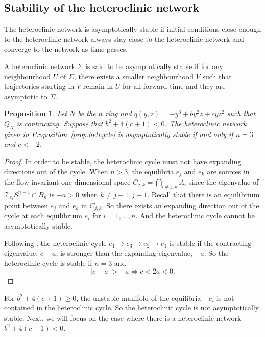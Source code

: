 \documentclass{article}
\newtheorem{prop}{Proposition}
\theoremstyle{definition}
\newenvironment{defi}
  {\pushQED{\qed}\renewcommand{\qedsymbol}{$\lozenge$}\defix}
  {\popQED\enddefix}
\begin{document}
\subsection{Stability of the heteroclinic network}

The heteroclinic network is asymptotically stable if initial conditions close enough to the heteroclinic network always stay close to the heteroclinic network and  converge to the network as time passes.

\begin{defi}{\cite[Definition 2.3.]{KM95}}
A heteroclinic network $\Sigma$ is said to be asymptotically stable if for any neighbourhood $U$ of $\Sigma$, there exists a smaller neighbourhood $V$ such that trajectories starting in $V$ remain in $U$ for all forward time and they are asymptotic to $\Sigma$.
\end{defi}



\begin{prop}
Let $N$ be the $n$ ring and $q(y,z)=- y^3+b y^2 z + c y z^2$ such that $Q_N$ is contracting. Suppose that $b^2+4(c+1)<0$. The heteroclinic network given in Proposition~\ref{prop:hetcycle} is asymptotically stable if and only if $n=3$ and $c<-2$.
\end{prop}

\begin{proof}
In order to be stable, the heteroclinic cycle must not have expanding directions out of the cycle. When $n>3$, the equilibria $e_j$ and $e_k$ are sources in the flow-invariant one-dimensional space $C_{j,k}=\bigcap_{i\neq j,k}{A_i}$ since the eigenvalue of $\mathcal{T}_{e_i} S^{n-1}\cap B_n$ is $-a>0$ when $k\neq j-1,j+1$. Recall that there is an equilibrium point between $e_j$ and $e_k$ in $C_{j,k}$.
So there exists an expanding direction out of the cycle at each equilibrium $e_i$ for $i=1,\dots,n$. And the heteroclinic cycle cannot be asymptotically stable.
 
Following \cite[Theorem 2.9]{KM95}, the heteroclinic cycle $e_1\rightarrow e_3\rightarrow e_{2}\rightarrow e_1$ is stable if the contracting eigenvalue, $c-a$, is stronger than the expanding eigenvalue, $-a$. 
So the heteroclinic cycle is stable if $n=3$ and $$|c-a|>-a\Leftrightarrow c<2a<0.$$ 
\end{proof}


For $b^2+4(c+1)\geq 0$, the unstable manifold of the equilibria $\pm e_i$ is not contained in the heteroclinic cycle.
So the heteroclinic cycle is not asymptotically stable. 
Next, we will focus on the case where there is a heteroclinic network $b^2+4(c+1)<0$.
\end{document}
